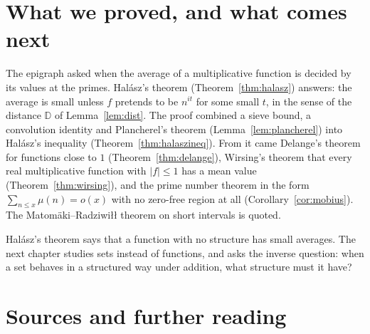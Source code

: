 \section{What we proved, and what comes next}

The epigraph asked when the average of a multiplicative function is decided by its values at the primes. Halász's theorem (Theorem~\ref{thm:halasz}) answers: the average is small unless $f$ pretends to be $n^{it}$ for some small $t$, in the sense of the distance $\mathbb D$ of Lemma~\ref{lem:dist}. The proof combined a sieve bound, a convolution identity and Plancherel's theorem (Lemma~\ref{lem:plancherel}) into Halász's inequality (Theorem~\ref{thm:halaszineq}). From it came Delange's theorem for functions close to $1$ (Theorem~\ref{thm:delange}), Wirsing's theorem that every real multiplicative function with $|f|\le1$ has a mean value (Theorem~\ref{thm:wirsing}), and the prime number theorem in the form $\sum_{n\le x}\mu(n)=o(x)$ with no zero-free region at all (Corollary~\ref{cor:mobius}). The Matomäki--Radziwiłł theorem on short intervals is quoted.

Halász's theorem says that a function with no structure has small averages. The next chapter studies sets instead of functions, and asks the inverse question: when a set behaves in a structured way under addition, what structure must it have?

\section*{Sources and further reading}

